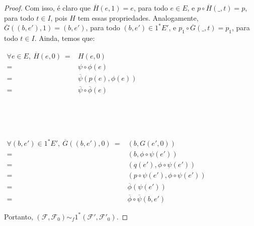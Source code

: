 \documentclass[12pt,oneside]{book} %
\begin{document}
\begin{proof}
	\par Com isso, é claro que $\overline{H}(e,1)=e$, para todo $e\in E$, e $p\circ\overline{H}(\_,t)=p$, para todo $t\in I$, pois $H$ tem essas propriedades. Analogamente, $\overline{G}((b,e'),1)=(b,e')$, para todo $(b,e')\in 1^{*}E'$, e $p_{1}\circ\overline{G}(\_,t)=p_{1}$, para todo $t\in I$. Ainda, temos que: \newline
	
	$\begin{array}{rl}
		\forall e\in E, \ \overline{H}(e,0) \ = & H(e,0) \\
		= & \psi\circ\phi(e) \\
		= & \overline{\psi}(p(e),\phi(e)) \\
		= & \overline{\psi}\circ\overline{\phi}(e)
	\end{array}$
	
	\
	
	\
	
	$\begin{array}{rl}
		\forall (b,e')\in 1^{*}E', \ \overline{G}((b,e'),0) \ = & (b,G(e',0)) \\
		= & (b,\phi\circ\psi(e')) \\
		= & (q(e'),\phi\circ\psi(e')) \\
		= & (p\circ\psi(e'),\phi\circ\psi(e')) \\
		= & \overline{\phi}(\psi(e')) \\
		= & \overline{\phi}\circ\overline{\psi}(b,e')
	\end{array}$ \newline
	
	\par Portanto, $(\mathcal{F},\mathcal{F}_{0})\sim_{f} 1^{*}(\mathcal{F'},\mathcal{F'}_{0})$.
	
\end{proof}
\end{document}
